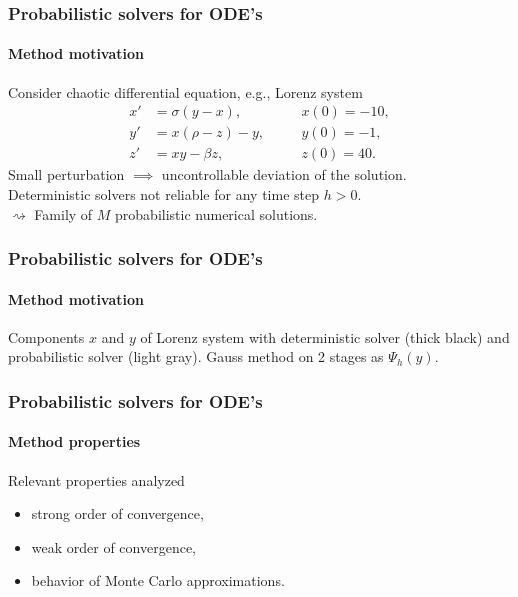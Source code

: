 \documentclass{beamer}
\begin{document}
\begin{frame}
	\frametitle{Probabilistic solvers for ODE's}
	\framesubtitle{Method motivation}
	
	Consider chaotic differential equation, e.g., Lorenz system
	\begin{equation*}\label{eq:Lorenz}
	\begin{aligned}
		x' &= \sigma(y - x), \quad &&x(0) = -10,\\
		y' &= x(\rho - z) - y, \quad &&y(0) = -1,\\
		z' &= xy - \beta z, \quad &&z(0) = 40.
	\end{aligned}
	\end{equation*}
	Small perturbation $\implies$ uncontrollable deviation of the solution. \\
	Deterministic solvers not reliable for any time step $h > 0$. \\
	$\rightsquigarrow$ Family of $M$ probabilistic numerical solutions.
\end{frame}

\begin{frame}
	\frametitle{Probabilistic solvers for ODE's}
	\framesubtitle{Method motivation}
	
	\begin{figure}[t]
		\centering
		\begin{subfigure}{1\linewidth}
			\resizebox{1.0\linewidth}{!}{}
		\end{subfigure}
		\begin{subfigure}{1\linewidth}
			\resizebox{1.0\linewidth}{!}{}
		\end{subfigure}
	\end{figure}

	Components $x$ and $y$ of Lorenz system with deterministic solver (thick black) and probabilistic solver (light gray). Gauss method on 2 stages as $\Psi_h(y)$.
\end{frame}

\begin{frame}
	\frametitle{Probabilistic solvers for ODE's}
	\framesubtitle{Method properties}
	
	Relevant properties analyzed
	\begin{itemize}
		\item strong order of convergence,
		\item weak order of convergence,
		\item behavior of Monte Carlo approximations.
	\end{itemize}
	
\end{frame}
\end{document}
